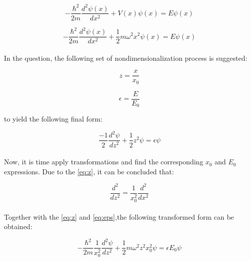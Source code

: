 \documentclass[letterpaper,12pt]{article}
\begin{document}
\begin{equation*}
    -\frac{\hbar^2}{2m} \frac{d^2 \psi(x)}{dx^2} + V(x)\psi(x) = E \psi(x)
\end{equation*}

\begin{equation*}
    -\frac{\hbar^2}{2m} \frac{d^2 \psi(x)}{dx^2} + \frac{1}{2}m\omega^2x^2\psi(x) = E \psi(x)
\end{equation*}

\paragraph{} In the question, the following set of nondimensionalization process is suggested:

\begin{equation}
    \label{eq:z}
    z = \frac{x}{x_0}
\end{equation}

\begin{equation}
    \label{eq:eps}
    \epsilon = \frac{E}{E_0}
\end{equation}

to yield the following final form:

\begin{equation*}
    \frac{-1}{2}\frac{d^2 \psi}{dz^2} + \frac{1}{2}z^2\psi = \epsilon\psi
\end{equation*}

\paragraph{} Now, it is time apply transformations and find the corresponding $x_0$ and $E_0$ expressions. Due to the \eqref{eq:z}, it can be concluded that:

\begin{equation*}
    \frac{d^2}{dz^2} = \frac{1}{x_0^2} \frac{d^2}{dx^2}
\end{equation*}

\paragraph{} Together with the \eqref{eq:z} and \eqref{eq:eps},the following transformed form can be obtained:

\begin{equation*}
    -\frac{\hbar^2}{2m}\frac{1}{x_0^2}\frac{d^2\psi}{dz^2} + \frac{1}{2}m\omega^2z^2x_0^2\psi = \epsilon E_0 \psi
\end{equation*}
\end{document}
